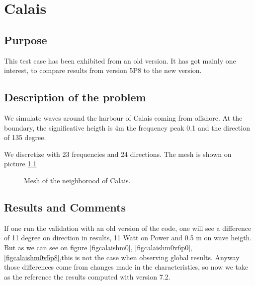 \chapter{Calais}
%
%
\section{Purpose}
%
This test case has been exhibited from an old version. It has got mainly one
interest, to compare results from version 5P8 to the new version.  

%
\section{Description of the problem}
We simulate waves around the harbour of Calais coming from offshore. 
At the boundary, the significative heigth is 4m the frequency peak 0.1 and the
direction of 135 degree.

We discretize with 23 frequencies and 24 directions. The mesh is shown on
picture \ref{figcalaismesh}

\begin{figure} [!h]
\centering
{}
 \caption{Mesh of the neighborood of Calais.}
\label{figcalaismesh}
\end{figure}

\section{Results and Comments}

If one run the validation with an old version of the code, one will see a
difference of 11 degree on direction in results, 11 Watt on Power and 0.5 m
on wave heigth. But as we can see on figure  \ref{figcalaishm0}, 
\ref{figcalaishm0v6p0}, \ref{figcalaishm0v5p8},this is not the case when
observing global results. Anyway those differences come from changes made in
the characteristics, so now we take as the reference the results computed with
version 7.2. 

